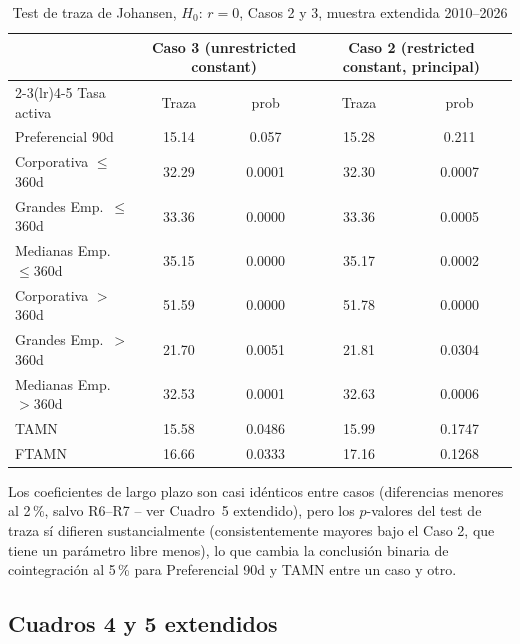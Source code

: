 \documentclass[12pt, letterpaper]{article}
\begin{document}
\begin{table}[ht]
\renewcommand{\thetable}{10}
\begin{threeparttable}
\caption{Test de traza de Johansen, $H_0{:}\,r=0$, Casos 2 y 3,
         muestra extendida 2010--2026}
\label{tab:trazaext}
\small
\begin{tabular}{lcccc}
\toprule
& \multicolumn{2}{c}{Caso 3 (unrestricted constant)} & \multicolumn{2}{c}{Caso 2 (restricted constant, principal)} \\
\cmidrule(lr){2-3}\cmidrule(lr){4-5}
Tasa activa & Traza & prob & Traza & prob \\
\midrule
Preferencial 90d         & 15.14 & 0.057  & 15.28 & 0.211 \\
Corporativa $\le$360d    & 32.29 & 0.0001 & 32.30 & 0.0007 \\
Grandes Emp.\ $\le$360d  & 33.36 & 0.0000 & 33.36 & 0.0005 \\
Medianas Emp.\ $\le$360d & 35.15 & 0.0000 & 35.17 & 0.0002 \\
Corporativa $>$360d      & 51.59 & 0.0000 & 51.78 & 0.0000 \\
Grandes Emp.\ $>$360d    & 21.70 & 0.0051 & 21.81 & 0.0304 \\
Medianas Emp.\ $>$360d   & 32.53 & 0.0001 & 32.63 & 0.0006 \\
TAMN                     & 15.58 & 0.0486 & 15.99 & 0.1747 \\
FTAMN                    & 16.66 & 0.0333 & 17.16 & 0.1268 \\
\bottomrule
\end{tabular}
\begin{tablenotes}[flushleft]
\footnotesize\item
Los coeficientes de largo plazo son casi idénticos entre casos
(diferencias menores al 2\,\%, salvo R6--R7 -- ver Cuadro~5 extendido), pero
los $p$-valores del test de traza sí difieren sustancialmente
(consistentemente mayores bajo el Caso 2, que tiene un parámetro libre
menos), lo que cambia la conclusión binaria de cointegración al 5\,\%
para Preferencial 90d y TAMN entre un caso y otro.
\end{tablenotes}
\end{threeparttable}
\end{table}

\subsection{Cuadros 4 y 5 extendidos}
\end{document}
